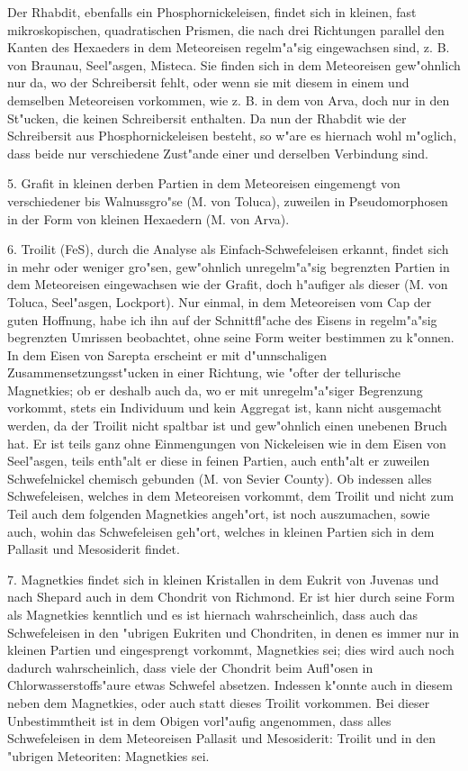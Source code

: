 \documentclass[a4paper, 11pt, oneside, german]{article}
\begin{document}
Der Rhabdit, ebenfalls ein Phosphornickeleisen, findet sich in kleinen, fast mikroskopischen, quadratischen Prismen, die nach drei Richtungen parallel den Kanten des Hexaeders in dem Meteoreisen regelm"a"sig eingewachsen sind, z. B. von Braunau, Seel"asgen, Misteca. Sie finden sich in dem Meteoreisen gew"ohnlich nur da, wo der Schreibersit fehlt, oder wenn sie mit diesem in einem und demselben Meteoreisen vorkommen, wie z. B. in dem von Arva, doch nur in den St"ucken, die keinen Schreibersit enthalten. Da nun der Rhabdit wie der Schreibersit aus Phosphornickeleisen besteht, so w"are es hiernach wohl m"oglich, dass beide nur verschiedene Zust"ande einer und derselben Verbindung sind.

5. Grafit in kleinen derben Partien in dem Meteoreisen eingemengt von verschiedener bis Walnussgro"se (M. von Toluca), zuweilen in Pseudomorphosen in der Form von kleinen Hexaedern (M. von Arva).

6. Troilit (FeS), durch die Analyse als Einfach-Schwefeleisen erkannt, findet sich in mehr oder weniger gro"sen, gew"ohnlich unregelm"a"sig begrenzten Partien in dem Meteoreisen eingewachsen wie der Grafit, doch h"aufiger als dieser (M. von Toluca, Seel"asgen, Lockport). Nur einmal, in dem Meteoreisen vom Cap der guten Hoffnung, habe ich ihn auf der Schnittfl"ache des Eisens in regelm"a"sig begrenzten Umrissen beobachtet, ohne seine Form weiter bestimmen zu k"onnen. In dem Eisen von Sarepta erscheint er mit d"unnschaligen Zusammensetzungsst"ucken in einer Richtung, wie "ofter der tellurische Magnetkies; ob er deshalb auch da, wo er mit unregelm"a"siger Begrenzung vorkommt, stets ein Individuum und kein Aggregat ist, kann nicht ausgemacht werden, da der Troilit nicht spaltbar ist und gew"ohnlich einen unebenen Bruch hat. Er ist teils ganz ohne Einmengungen von Nickeleisen wie in dem Eisen von Seel"asgen, teils enth"alt er diese in feinen Partien, auch enth"alt er zuweilen Schwefelnickel chemisch gebunden (M. von Sevier County). Ob indessen alles Schwefeleisen, welches in dem Meteoreisen vorkommt, dem Troilit und nicht zum Teil auch dem folgenden Magnetkies angeh"ort, ist noch auszumachen, sowie auch, wohin das Schwefeleisen geh"ort, welches in kleinen Partien sich in dem Pallasit und Mesosiderit findet.

7. Magnetkies findet sich in kleinen Kristallen in dem Eukrit von Juvenas und nach Shepard auch in dem Chondrit von Richmond. Er ist hier durch seine Form als Magnetkies kenntlich und es ist hiernach wahrscheinlich, dass auch das Schwefeleisen in den "ubrigen Eukriten und Chondriten, in denen es immer nur in kleinen Partien und eingesprengt vorkommt, Magnetkies sei; dies wird auch noch dadurch wahrscheinlich, dass viele der Chondrit beim Aufl"osen in Chlorwasserstoffs"aure etwas Schwefel absetzen. Indessen k"onnte auch in diesem neben dem Magnetkies, oder auch statt dieses Troilit vorkommen. Bei dieser Unbestimmtheit ist in dem Obigen vorl"aufig angenommen, dass alles Schwefeleisen in dem Meteoreisen Pallasit und Mesosiderit: Troilit und in den "ubrigen Meteoriten: Magnetkies sei.
\end{document}
